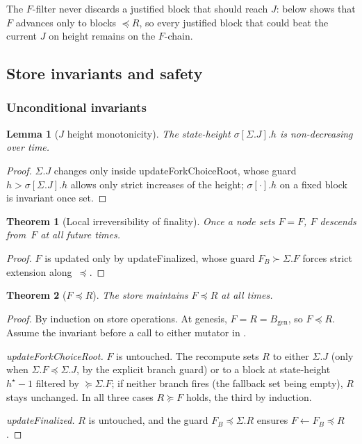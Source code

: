 \documentclass{article}
\newcommand{\genesis}{\ensuremath{B_{\mathrm{gen}}}}
\newcommand{\updateForkChoiceRoot}{\textsf{updateForkChoiceRoot}\xspace}
\newcommand{\updateFinalized}{\textsf{updateFinalized}\xspace}
\theoremstyle{plain}
\newtheorem{theorem}{Theorem}
\newtheorem{lemma}{Lemma}
\theoremstyle{definition}
\theoremstyle{remark}
\begin{document}
The $F$-filter never discards a justified block that should reach $J$:  below shows that $F$ advances only to blocks $\preceq R$, so every justified block that could beat the current $J$ on height remains on the $F$-chain.

\subsection{Store invariants and safety}

\subsubsection*{Unconditional invariants}

\begin{lemma}[$J$ height monotonicity]\label{lem:J-monotone}
The state-height $\sigma[\Sigma.J].h$ is non-decreasing over time.
\end{lemma}

\begin{proof}
$\Sigma.J$ changes only inside \updateForkChoiceRoot, whose guard $h > \sigma[\Sigma.J].h$ allows only strict increases of the height; $\sigma[\cdot].h$ on a fixed block is invariant once set.
\end{proof}

\begin{theorem}[Local irreversibility of finality]\label{thm:finperm}
Once a node sets $F = F$, $F$ descends from~$F$ at all future times.
\end{theorem}

\begin{proof}
$F$ is updated only by \updateFinalized, whose guard $F_B \succ \Sigma.F$ forces strict extension along~$\preceq$.
\end{proof}

\begin{theorem}[$F \preceq R$]\label{thm:fleqr}
The store maintains $F \preceq R$ at all times.
\end{theorem}

\begin{proof}
By induction on store operations.
At genesis, $F = R = \genesis$, so $F \preceq R$.
Assume the invariant before a call to either mutator in .

\emph{\updateForkChoiceRoot.}
$F$ is untouched. The recompute sets $R$ to either $\Sigma.J$ (only when $\Sigma.F \preceq \Sigma.J$, by the explicit branch guard) or to a block at state-height $h^\star - 1$ filtered by $\succeq \Sigma.F$; if neither branch fires (the fallback set being empty), $R$ stays unchanged. In all three cases $R \succeq F$ holds, the third by induction.

\emph{\updateFinalized.}
$R$ is untouched, and the guard $F_B \preceq \Sigma.R$ ensures $F \gets F_B \preceq R$.
\end{proof}
\end{document}
